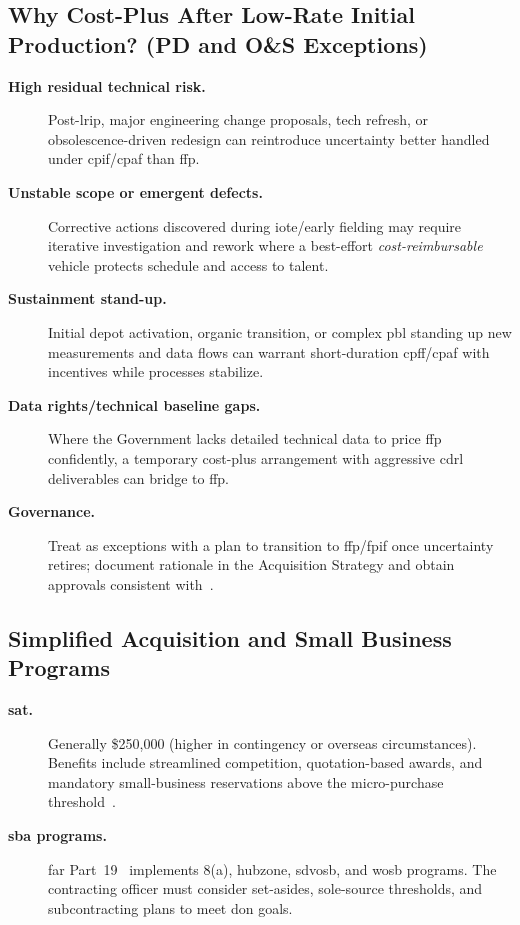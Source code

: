 \documentclass[../main.tex]{subfiles}
\begin{document}
\subsection{Why Cost-Plus After Low-Rate Initial Production? (PD and O\&S Exceptions)}
\begin{description}
  \item[\textbf{High residual technical risk.}] Post-\ac{lrip}, major engineering change proposals, tech refresh, or obsolescence-driven redesign can reintroduce uncertainty better handled under \ac{cpif}/\ac{cpaf} than \ac{ffp}.
  \item[\textbf{Unstable scope or emergent defects.}] Corrective actions discovered during \ac{iote}/early fielding may require iterative investigation and rework where a best-effort \emph{cost-reimbursable} vehicle protects schedule and access to talent.
  \item[\textbf{Sustainment stand-up.}] Initial depot activation, organic transition, or complex \ac{pbl} standing up new measurements and data flows can warrant short-duration \ac{cpff}/\ac{cpaf} with incentives while processes stabilize.
  \item[\textbf{Data rights/technical baseline gaps.}] Where the Government lacks detailed technical data to price \ac{ffp} confidently, a temporary cost-plus arrangement with aggressive \ac{cdrl} deliverables can bridge to \ac{ffp}.
  \item[\textbf{Governance.}] Treat as exceptions with a plan to transition to \ac{ffp}/\ac{fpif} once uncertainty retires; document rationale in the Acquisition Strategy and obtain approvals consistent with~\autocite{FAR,DFARS}.
\end{description}

\subsection{Simplified Acquisition and Small Business Programs}
\begin{description}
  \item[\textbf{\ac{sat}.}] Generally \$250{,}000 (higher in contingency or overseas circumstances). Benefits include streamlined competition, quotation-based awards, and mandatory small-business reservations above the micro-purchase threshold~\autocite{FAR}.
  \item[\textbf{\ac{sba} programs.}] \ac{far} Part~19~\autocite[Part~19]{FAR} implements 8(a), \ac{hubzone}, \ac{sdvosb}, and \ac{wosb} programs. The contracting officer must consider set-asides, sole-source thresholds, and subcontracting plans to meet \ac{don} goals.
\end{description}
\end{document}
